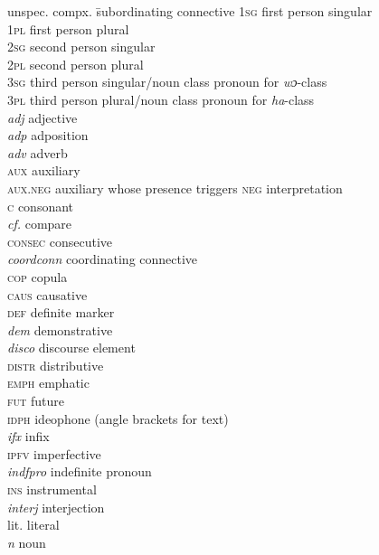 \addchap{\lsAbbreviationsTitle}


\begin{tabbing}
unspec. compx.\hspace{1ex} \= subordinating connective\kill
\textsc{1sg} \> first person singular\\
\textsc{1pl} \> first person plural\\
\textsc{2sg} \> second person singular\\
\textsc{2pl} \> second person plural\\
\textsc{3sg} \> third person singular/noun class pronoun for \textit{wɔ}-class\\
\textsc{3pl} \> third person plural/noun class pronoun for \textit{ha}-class\\
\textit{adj} \>  adjective\\
\textit{adp} \>  adposition\\
\textit{adv} \>  adverb \\
\textsc{aux} \> auxiliary\\
\textsc{aux.neg} \> auxiliary whose presence triggers \textsc{neg} interpretation \\
\textsc{c} \> consonant\\
\textit{cf.} \> compare\\
\textsc{consec} \> consecutive\\
\textit{coordconn} \> coordinating connective\\
\textsc{cop} \> copula\\
\textsc{caus} \> causative\\
\textsc{def} \> definite marker\\
\textit{dem} \> demonstrative\\
\textit{disco} \> discourse element\\
\textsc{distr} \> distributive\\
\textsc{emph} \> emphatic\\
\textsc{fut} \> future\\
\textsc{idph} \> ideophone (angle brackets for text)\\
\textit{ifx} \> infix\\
\textsc{ipfv} \> imperfective\\
\textit{indfpro} \> indefinite pronoun\\
\textsc{ins} \> instrumental\\
\textit{interj} \>  interjection\\
lit. \> literal\\
\textit{n} \> noun\\

\end{tabbing}
